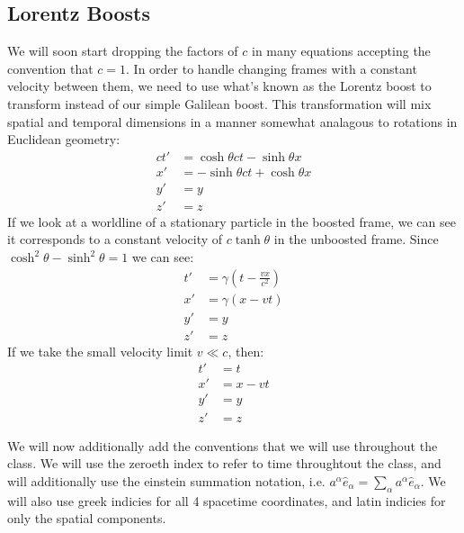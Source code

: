 \subsection{Lorentz Boosts}
We will soon start dropping the factors of $c$ in many equations accepting the convention that $c=1$. 
In order to handle changing frames with a constant velocity between them, we need to use what's known as the Lorentz boost to transform instead of our simple Galilean boost.
This transformation will mix spatial and temporal dimensions in a manner somewhat analagous to rotations in Euclidean geometry:
\begin{align*}
	ct' &= \cosh\theta ct - \sinh\theta x \\
	x' &= -\sinh\theta ct + \cosh\theta x \\
	y' &= y \\
	z' &=z
\end{align*}
If we look at a worldline of a stationary particle in the boosted frame, we can see it corresponds to a constant velocity of $c\tanh\theta$ in the unboosted frame. Since $\cosh^2\theta -\sinh^2\theta = 1$ we can see:
\begin{align*}
	t' &= \gamma\left(t - \frac{vx}{c^2}\right) \\
	x' &= \gamma\left(x - v t\right) \\
	y' &= y \\
	z' &= z
\end{align*}
If we take the small velocity limit $v \ll c$, then:
\begin{align*}
	t' &= t \\
	x' &= x - v t \\
	y' &= y \\
	z' &= z
\end{align*}

We will now additionally add the conventions that we will use throughout the class. 
We will use the zeroeth index to refer to time throughtout the class, and will additionally use the einstein summation notation, i.e. $a^\alpha \hat{e}_\alpha = \sum_\alpha a^\alpha \hat{e}_\alpha$. 
We will also use greek indicies for all 4 spacetime coordinates, and latin indicies for only the spatial components.

